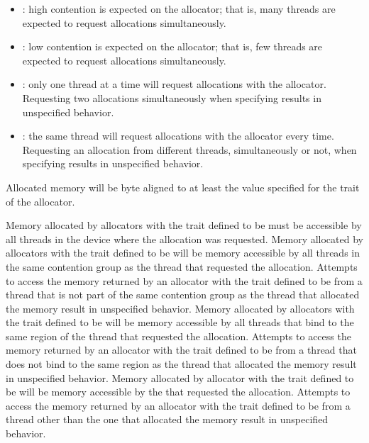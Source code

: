 \begin{itemize}
\item {}: high contention is expected on the allocator; that 
      is, many threads are expected to request allocations simultaneously.
\item {}: low contention is expected on the allocator; that 
      is, few threads are expected to request allocations simultaneously.
\item {}: only one thread at a time will request allocations 
      with the allocator. Requesting two allocations simultaneously when 
      specifying  results in unspecified behavior.
\item {}: the same thread will request allocations with the 
      allocator every time. Requesting an allocation from different threads, 
      simultaneously or not, when specifying  results in 
      unspecified behavior.
\end{itemize}

Allocated memory will be byte aligned to at least the value specified for the 
{} trait of the allocator.

Memory allocated by allocators with the  trait defined to be 
 must be accessible by all threads in the device where the allocation 
was requested. Memory allocated by allocators with the  trait 
defined to be  will be memory accessible by all threads in the 
same contention group as the thread that requested the allocation. Attempts to 
access the memory returned by an allocator with the  trait 
defined to be  from a thread that is not part of the same 
contention group as the thread that allocated the memory result in unspecified 
behavior. Memory allocated by allocators with the  trait defined 
to be  will be memory accessible by all threads that bind to the 
same {} region of the thread that requested the allocation. Attempts 
to access the memory returned by  an allocator with the  trait 
defined to be  from a thread that does not bind to the same 
{} region as the thread that allocated the memory result 
in unspecified behavior. Memory allocated by allocator with the  
trait defined to be  will be memory accessible by the {} 
that requested the allocation. Attempts to access the memory returned by an allocator 
with the  trait defined to be  from a thread other 
than the one that allocated the memory result in unspecified behavior.

